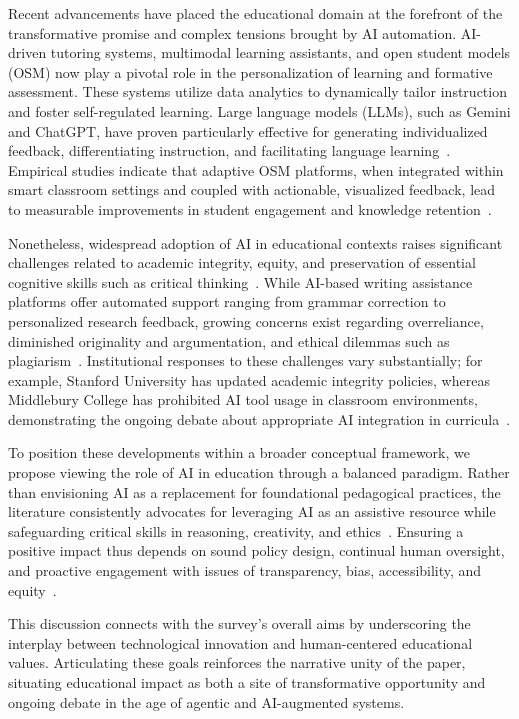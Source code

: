 \documentclass[sigconf]{acmart}
\begin{document}
Recent advancements have placed the educational domain at the forefront of the transformative promise and complex tensions brought by AI automation. AI-driven tutoring systems, multimodal learning assistants, and open student models (OSM) now play a pivotal role in the personalization of learning and formative assessment. These systems utilize data analytics to dynamically tailor instruction and foster self-regulated learning. Large language models (LLMs), such as Gemini and ChatGPT, have proven particularly effective for generating individualized feedback, differentiating instruction, and facilitating language learning~\cite{ref109,ref110,ref111}. Empirical studies indicate that adaptive OSM platforms, when integrated within smart classroom settings and coupled with actionable, visualized feedback, lead to measurable improvements in student engagement and knowledge retention~\cite{ref110,ref111}.

Nonetheless, widespread adoption of AI in educational contexts raises significant challenges related to academic integrity, equity, and preservation of essential cognitive skills such as critical thinking~\cite{ref109,ref110,ref112,ref113,ref114,ref115}. While AI-based writing assistance platforms offer automated support ranging from grammar correction to personalized research feedback, growing concerns exist regarding overreliance, diminished originality and argumentation, and ethical dilemmas such as plagiarism~\cite{ref109,ref110,ref112,ref113,ref114,ref115}. Institutional responses to these challenges vary substantially; for example, Stanford University has updated academic integrity policies, whereas Middlebury College has prohibited AI tool usage in classroom environments, demonstrating the ongoing debate about appropriate AI integration in curricula~\cite{ref109,ref110,ref113,ref114,ref115}.

To position these developments within a broader conceptual framework, we propose viewing the role of AI in education through a balanced paradigm. Rather than envisioning AI as a replacement for foundational pedagogical practices, the literature consistently advocates for leveraging AI as an assistive resource while safeguarding critical skills in reasoning, creativity, and ethics~\cite{ref109,ref110,ref113,ref114,ref115}. Ensuring a positive impact thus depends on sound policy design, continual human oversight, and proactive engagement with issues of transparency, bias, accessibility, and equity~\cite{ref110,ref111,ref113,ref114,ref115}.

This discussion connects with the survey's overall aims by underscoring the interplay between technological innovation and human-centered educational values. Articulating these goals reinforces the narrative unity of the paper, situating educational impact as both a site of transformative opportunity and ongoing debate in the age of agentic and AI-augmented systems.
\end{document}
